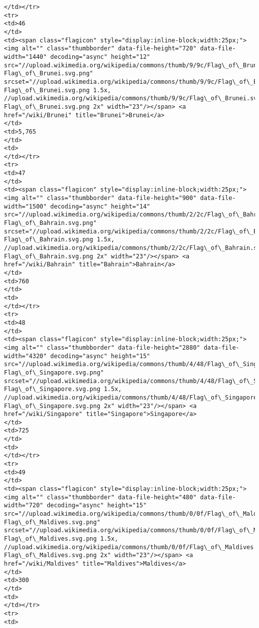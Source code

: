 \documentclass[11pt]{article}
\begin{document}
\begin{Verbatim}[commandchars=\\\{\}]
</td></tr>
<tr>
<td>46
</td>
<td><span class="flagicon" style="display:inline-block;width:25px;"><img alt="" class="thumbborder" data-file-height="720" data-file-width="1440" decoding="async" height="12" src="//upload.wikimedia.org/wikipedia/commons/thumb/9/9c/Flag\_of\_Brunei.svg/23px-Flag\_of\_Brunei.svg.png" srcset="//upload.wikimedia.org/wikipedia/commons/thumb/9/9c/Flag\_of\_Brunei.svg/35px-Flag\_of\_Brunei.svg.png 1.5x, //upload.wikimedia.org/wikipedia/commons/thumb/9/9c/Flag\_of\_Brunei.svg/46px-Flag\_of\_Brunei.svg.png 2x" width="23"/></span> <a href="/wiki/Brunei" title="Brunei">Brunei</a>
</td>
<td>5,765
</td>
<td>
</td></tr>
<tr>
<td>47
</td>
<td><span class="flagicon" style="display:inline-block;width:25px;"><img alt="" class="thumbborder" data-file-height="900" data-file-width="1500" decoding="async" height="14" src="//upload.wikimedia.org/wikipedia/commons/thumb/2/2c/Flag\_of\_Bahrain.svg/23px-Flag\_of\_Bahrain.svg.png" srcset="//upload.wikimedia.org/wikipedia/commons/thumb/2/2c/Flag\_of\_Bahrain.svg/35px-Flag\_of\_Bahrain.svg.png 1.5x, //upload.wikimedia.org/wikipedia/commons/thumb/2/2c/Flag\_of\_Bahrain.svg/46px-Flag\_of\_Bahrain.svg.png 2x" width="23"/></span> <a href="/wiki/Bahrain" title="Bahrain">Bahrain</a>
</td>
<td>760
</td>
<td>
</td></tr>
<tr>
<td>48
</td>
<td><span class="flagicon" style="display:inline-block;width:25px;"><img alt="" class="thumbborder" data-file-height="2880" data-file-width="4320" decoding="async" height="15" src="//upload.wikimedia.org/wikipedia/commons/thumb/4/48/Flag\_of\_Singapore.svg/23px-Flag\_of\_Singapore.svg.png" srcset="//upload.wikimedia.org/wikipedia/commons/thumb/4/48/Flag\_of\_Singapore.svg/35px-Flag\_of\_Singapore.svg.png 1.5x, //upload.wikimedia.org/wikipedia/commons/thumb/4/48/Flag\_of\_Singapore.svg/45px-Flag\_of\_Singapore.svg.png 2x" width="23"/></span> <a href="/wiki/Singapore" title="Singapore">Singapore</a>
</td>
<td>725
</td>
<td>
</td></tr>
<tr>
<td>49
</td>
<td><span class="flagicon" style="display:inline-block;width:25px;"><img alt="" class="thumbborder" data-file-height="480" data-file-width="720" decoding="async" height="15" src="//upload.wikimedia.org/wikipedia/commons/thumb/0/0f/Flag\_of\_Maldives.svg/23px-Flag\_of\_Maldives.svg.png" srcset="//upload.wikimedia.org/wikipedia/commons/thumb/0/0f/Flag\_of\_Maldives.svg/35px-Flag\_of\_Maldives.svg.png 1.5x, //upload.wikimedia.org/wikipedia/commons/thumb/0/0f/Flag\_of\_Maldives.svg/45px-Flag\_of\_Maldives.svg.png 2x" width="23"/></span> <a href="/wiki/Maldives" title="Maldives">Maldives</a>
</td>
<td>300
</td>
<td>
</td></tr>
<tr>
<td>

\end{Verbatim}
\end{document}
